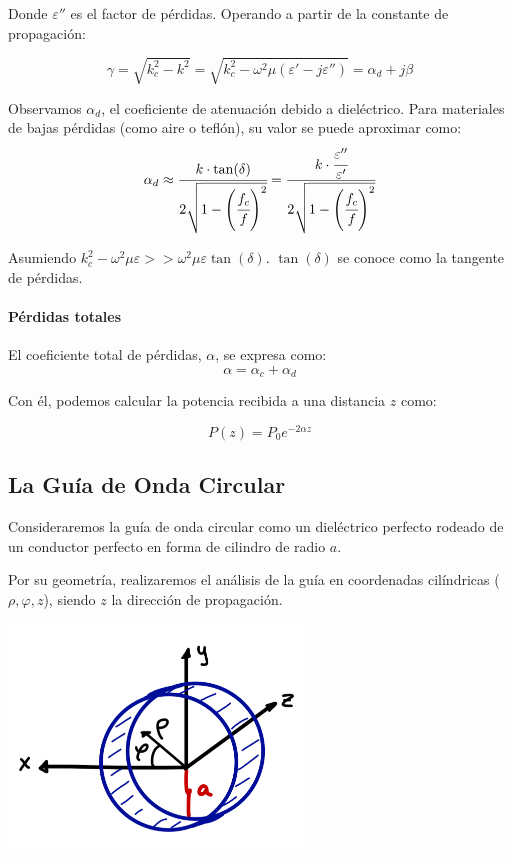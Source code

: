\documentclass[12pt]{article}
\begin{document}
Donde $\varepsilon''$ es el factor de p\'erdidas. Operando a partir de la constante de propagaci\'on:

$$\gamma = \sqrt{k^2_c -k^2} = \sqrt{k^2_c -\omega^2\mu(\varepsilon' -j\varepsilon'')} = \alpha_d +j\beta$$

Observamos $\alpha_d$, el coeficiente de atenuaci\'on debido a diel\'ectrico. Para materiales de bajas p\'erdidas (como aire o tefl\'on), su valor se puede aproximar como:
$$\alpha_d \approx \cfrac{k\cdot \tan(\delta)}{2\sqrt{1-\left(\cfrac{f_c}{f}\right)^2}} = \cfrac{k\cdot \cfrac{\varepsilon''}{\varepsilon'}}{2\sqrt{1-\left(\cfrac{f_c}{f}\right)^2}}$$

Asumiendo $k^2_c -\omega^2\mu\varepsilon >> \omega^2\mu\varepsilon \tan(\delta)$. $\tan(\delta)$ se conoce como la tangente de p\'erdidas.

\paragraph{P\'erdidas totales}

El coeficiente total de p\'erdidas, $\alpha$, se expresa como:
$$\alpha = \alpha_c +\alpha_d$$

Con \'el, podemos calcular la potencia recibida a una distancia $z$ como:

$$P(z) = P_0e^{-2\alpha z}$$

\subsection{La Gu\'ia de Onda Circular}

Consideraremos la gu\'ia de onda circular como un diel\'ectrico perfecto rodeado de un conductor perfecto en forma de cilindro de radio $a$.


Por su geometr\'ia, realizaremos el an\'alisis de la gu\'ia en coordenadas cil\'indricas ($\rho, \varphi, z$), siendo $z$ la direcci\'on de propagaci\'on.
\begin{center}
	\includegraphics[width=8cm]{img/Guia_de_onda_circular.jpg}
\end{center}
\end{document}
